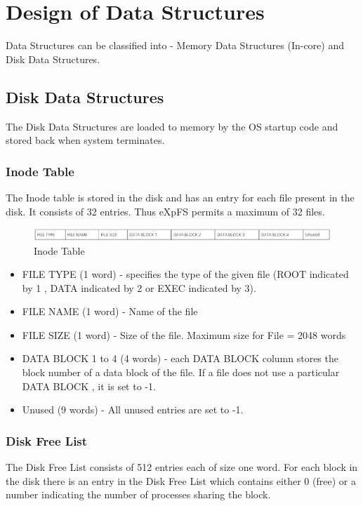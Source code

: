 \chapter{Design of Data Structures}
\label{chap8}

Data Structures can be classified into - Memory Data Structures (In-core) and Disk Data Structures. 
\section{Disk Data Structures}
The Disk Data Structures are loaded to memory by the OS startup code and stored back when system terminates.
\subsection{Inode Table}

The Inode table is stored in the disk and has an entry for each file present in the disk. It consists of 32 entries. Thus eXpFS permits a maximum of 32 files.
\begin{figure}[ht]
\centering
\includegraphics [scale=0.55]{figures/INODE.png}
\caption{\footnotesize Inode Table}
\end{figure}

\begin{itemize}
\item FILE TYPE (1 word) - specifies the type of the given file (ROOT indicated by 1 , DATA indicated by 2 or EXEC indicated by 3). 
\item FILE NAME (1 word) - Name of the file
\item FILE SIZE (1 word) - Size of the file. Maximum size for File = 2048 words
\item DATA BLOCK 1 to 4 (4 words) - each DATA BLOCK column stores the block number of a data block of the file. If a file does not use a particular DATA BLOCK , it is set to -1.
\item Unused (9 words) - All unused entries are set to -1.
\end{itemize}



\subsection{Disk Free List}

The Disk Free List consists of 512 entries each of size one word. For each block in the disk there is an entry in the Disk Free List which contains either 0 (free) or a number indicating the number of processes sharing the block.

